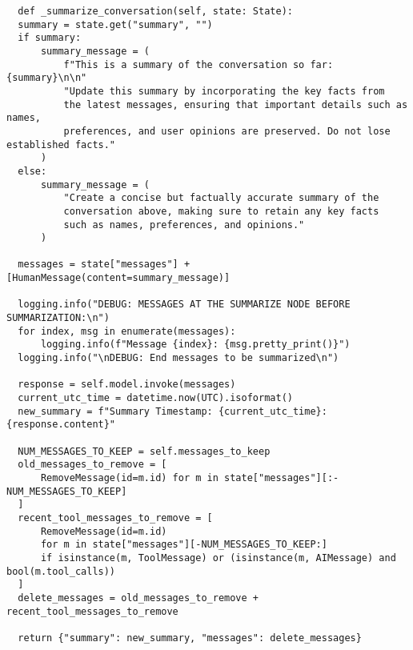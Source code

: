 \documentclass[11pt]{article}
\begin{document}
\begin{verbatim}
  def _summarize_conversation(self, state: State):
  summary = state.get("summary", "")
  if summary:
      summary_message = (
          f"This is a summary of the conversation so far: {summary}\n\n"
          "Update this summary by incorporating the key facts from 
          the latest messages, ensuring that important details such as names, 
          preferences, and user opinions are preserved. Do not lose established facts."
      )
  else:
      summary_message = (
          "Create a concise but factually accurate summary of the 
          conversation above, making sure to retain any key facts 
          such as names, preferences, and opinions."
      )

  messages = state["messages"] + [HumanMessage(content=summary_message)]

  logging.info("DEBUG: MESSAGES AT THE SUMMARIZE NODE BEFORE SUMMARIZATION:\n")
  for index, msg in enumerate(messages):
      logging.info(f"Message {index}: {msg.pretty_print()}")
  logging.info("\nDEBUG: End messages to be summarized\n")

  response = self.model.invoke(messages)
  current_utc_time = datetime.now(UTC).isoformat()
  new_summary = f"Summary Timestamp: {current_utc_time}: {response.content}"

  NUM_MESSAGES_TO_KEEP = self.messages_to_keep
  old_messages_to_remove = [
      RemoveMessage(id=m.id) for m in state["messages"][:-NUM_MESSAGES_TO_KEEP]
  ]
  recent_tool_messages_to_remove = [
      RemoveMessage(id=m.id)
      for m in state["messages"][-NUM_MESSAGES_TO_KEEP:]
      if isinstance(m, ToolMessage) or (isinstance(m, AIMessage) and bool(m.tool_calls))
  ]
  delete_messages = old_messages_to_remove + recent_tool_messages_to_remove

  return {"summary": new_summary, "messages": delete_messages}

\end{verbatim}
\end{document}
